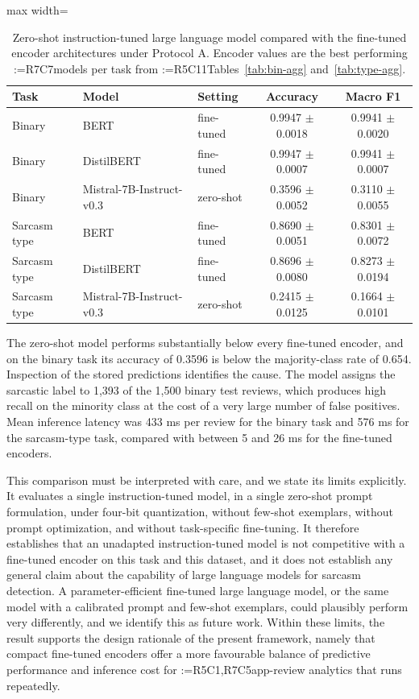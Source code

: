 \documentclass[a4paper,fleqn]{cas-sc}
\makeatletter
\newif\iftracked
\newcommand{\rv@setcolour}[1]{%
  \IfStrEq{#1}{R7C7}{\color{rvEdit}}{%
    \IfSubStr{#1}{R5}{\IfSubStr{#1}{R7}{\color{rvBoth}}{\color{rvFive}}}{\color{rvSeven}}}}
\newcommand{\rv@tag}[1]{\textsuperscript{\sffamily\bfseries\scriptsize[\StrSubstitute{#1}{,}{, }]}\,}
\newcommand{\rv@recordone}[1]{%
  \edef\rv@i{#1}%
  \ifcsdef{rv@n@\rv@i}{}{\csgdef{rv@n@\rv@i}{0}}%
  \csxdef{rv@n@\rv@i}{\the\numexpr\csuse{rv@n@\rv@i}+1\relax}%
  \begingroup\edef\@currentlabel{\rv@i}\label{rv:\rv@i:\csuse{rv@n@\rv@i}}\endgroup}
\newcommand{\rv@record}[1]{\@for\rv@id:=#1\do{\expandafter\rv@recordone\expandafter{\rv@id}}}
\DeclareRobustCommand{\rcx}[2]{\iftracked{\rv@setcolour{#1}\rv@tag{#1}#2}\else#2\fi}
\DeclareRobustCommand{\rcrep}[3]{\rv@record{#1}\iftracked{\rv@setcolour{#1}\rv@tag{#1}\rv@strike{#2} #3}\else#3\fi}
\DeclareRobustCommand{\rce}[1]{\rv@record{R7C7}\iftracked{\color{rvEdit}#1}\else#1\fi}
\makeatother
\begin{document}
\begin{table}[t]
\caption{Zero-shot instruction-tuned large language model compared with the fine-tuned encoder architectures\rcx{R5C9,R7C2}{ under Protocol A}. Encoder values are the best performing \rce{models} per task from \rcrep{R5C11}{Tables 6 and 8}{Tables~\ref{tab:bin-agg} and~\ref{tab:type-agg}}.}
\label{tab:llm}
\centering\small
\begin{adjustbox}{max width=\textwidth}
\begin{tabular}{lllcc}
\toprule
Task & Model & Setting & Accuracy & Macro F1 \\
\midrule
Binary & BERT & fine-tuned & 0.9947 $\pm$ 0.0018 & 0.9941 $\pm$ 0.0020 \\
Binary & DistilBERT & fine-tuned & 0.9947 $\pm$ 0.0007 & 0.9941 $\pm$ 0.0007 \\
Binary & Mistral-7B-Instruct-v0.3 & zero-shot & 0.3596 $\pm$ 0.0052 & 0.3110 $\pm$ 0.0055 \\
\midrule
Sarcasm type & BERT & fine-tuned & 0.8690 $\pm$ 0.0051 & 0.8301 $\pm$ 0.0072 \\
Sarcasm type & DistilBERT & fine-tuned & 0.8696 $\pm$ 0.0080 & 0.8273 $\pm$ 0.0194 \\
Sarcasm type & Mistral-7B-Instruct-v0.3 & zero-shot & 0.2415 $\pm$ 0.0125 & 0.1664 $\pm$ 0.0101 \\
\bottomrule
\end{tabular}
\end{adjustbox}
\end{table}

The zero-shot model performs substantially below every fine-tuned encoder, and on the binary task its accuracy of 0.3596 is below the majority-class rate of 0.654. Inspection of the stored predictions identifies the cause. The model assigns the sarcastic label to 1,393 of the 1,500 binary test reviews, which produces high recall on the minority class at the cost of a very large number of false positives. Mean inference latency was 433 ms per review for the binary task and 576 ms for the sarcasm-type task, compared with between 5 and 26 ms for the fine-tuned encoders.

This comparison must be interpreted with care, and we state its limits explicitly. It evaluates a single instruction-tuned model, in a single zero-shot prompt formulation, under four-bit quantization, without few-shot exemplars, without prompt optimization, and without task-specific fine-tuning. It therefore establishes that an unadapted instruction-tuned model is not competitive with a fine-tuned encoder on this task and this dataset, and it does not establish any general claim about the capability of large language models for sarcasm detection. A parameter-efficient fine-tuned large language model, or the same model with a calibrated prompt and few-shot exemplars, could plausibly perform very differently, and we identify this as future work. Within these limits, the result supports the design rationale of the present framework, namely that compact fine-tuned encoders offer a more favourable balance of predictive performance and inference cost for \rcrep{R5C1,R7C5}{continuous app-review analytics}{app-review analytics that runs repeatedly}.
\end{document}
